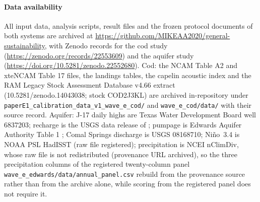 \paragraph{Data availability} All input data, analysis scripts, result files and the frozen protocol documents of both systems are archived at \url{https://github.com/MIKEAA2020/general-sustainability}, with Zenodo records for the cod study (\url{https://zenodo.org/records/22553609}) and the aquifer study (\url{https://doi.org/10.5281/zenodo.22552680}). Cod: the NCAM Table A2 and xteNCAM Table 17 files, the landings tables, the capelin acoustic index and the RAM Legacy Stock Assessment Database v4.66 extract (10.5281/zenodo.14043038; stock COD2J3KL) are archived in-repository under \texttt{paperE1\_calibration\_data\_v1\_wave\_e\_cod/} and \texttt{wave\_e\_cod/data/} with their source record. Aquifer: J-17 daily highs are Texas Water Development Board well 6837203; recharge is the USGS data release of \citet{UmphresChoi2025}; pumpage is Edwards Aquifer Authority Table 1 \citep{EAA2024}; Comal Springs discharge is USGS 08168710; Ni\~no~3.4 is NOAA PSL HadISST (raw file registered); precipitation is NCEI nClimDiv, whose raw file is not redistributed (provenance URL archived), so the three precipitation columns of the registered twenty-column panel \texttt{wave\_e\_edwards/data/annual\_panel.csv} rebuild from the provenance source rather than from the archive alone, while scoring from the registered panel does not require it.

